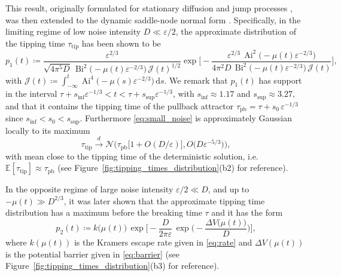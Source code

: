 \documentclass[openacc]{rsproca_new}
\newcommand{\dd}{\mathrm{d}}
\newcommand{\Ai}{\operatorname{Ai}}
\newcommand{\Bi}{\operatorname{Bi}}
\newcommand{\E}{\mathbb{E}}
\begin{document}
This result, originally formulated for stationary diffusion \cite{Day1983} and jump processes \cite{Imkeller2006}, was then extended to the dynamic saddle-node normal form \cite{Miller2012}.
Specifically, in the limiting regime of low noise intensity $D\ll\varepsilon/2$, the approximate distribution of the tipping time $\tau_{\mathrm{tip}}$ has been shown to be \cite[Eq.~$(19)$]{Miller2012}
%
\begin{equation}\label{eq:small_noise}
        p_1(t)\coloneqq\frac{\varepsilon^{2/3}}{\sqrt{4\pi^{5}D}\,\Bi^{2}\bigl(-\mu(t)\varepsilon^{-2/3}\bigr)\,\mathcal J(t)^{1/2}}
        \exp\Biggl[-\frac{\varepsilon^{2/3}\,\Ai^{2}\bigl(-\mu(t)\varepsilon^{-2/3}\bigr)}
        {4\pi^{2}D\,\Bi^{2}\bigl(-\mu(t)\varepsilon^{-2/3}\bigr)\,\mathcal J(t)}\Biggr] ,
\end{equation}
%
with $\mathcal J(t)\coloneqq\int_{-\infty}^{t}\Ai^{4}\bigl(-\mu(s)\varepsilon^{-2/3}\bigr)\,\dd s$. 
We remark that $p_1(t)$ has support in the interval $\tau+ s_{\mathrm{inf}}\varepsilon^{-1/3} < t < \tau +  s_{\mathrm{sup}}\varepsilon^{-1/3}$, with $s_{\mathrm{inf}}\approx1.17$ and $s_{\mathrm{sup}}\approx3.27$, and that it contains the tipping time of the pullback attractor $\tau_{\mathrm{pb}} = \tau+s_0\,\varepsilon^{-1/3}$ since $s_{\mathrm{inf}} < s_0 < s_{\mathrm{sup}}$.
Furthermore \eqref{eq:small_noise} is approximately Gaussian locally to its maximum
%
\begin{equation}\label{eq:small_noise_approximation}
        \tau_{\mathrm{tip}}\overset{d}{\to}\mathcal{N}\biggl(\tau_{\mathrm{pb}}\bigl[1+O(D/\varepsilon)\bigr],O\bigl(D\varepsilon^{-5/3}\bigr)\biggr),
\end{equation}
%
with mean close to the tipping time of the deterministic solution, i.e. $\E[\tau_{\mathrm{tip}}]\approx\tau_{\mathrm{pb}}$ (see Figure~\ref{fig:tipping_times_distribution}(b2) for reference).

In the opposite regime of large noise intensity $\varepsilon/2\ll D$, and up to $-\mu(t)\gg D^{2/3}$, it was later shown that the approximate tipping time distribution has a maximum before the breaking time $\tau$ and it has the form \cite[Eq.~$(4)$]{Herbert2017}
%
\begin{equation}\label{eq:large_noise}
        p_2(t)\coloneqq k\bigl(\mu(t)\bigr)\,
        \exp\biggl[-\frac{D}{2\pi\varepsilon}\,
        \exp\biggl(-\frac{\Delta V\bigl(\mu(t)\bigr)}{D}\biggr)\biggr] ,
\end{equation}
%
where $k(\mu(t))$ is the Kramers escape rate given in \eqref{eq:rate} and $\Delta V(\mu(t))$ is the potential barrier given in \eqref{eq:barrier} (see Figure~\ref{fig:tipping_times_distribution}(b3) for reference).
\end{document}
